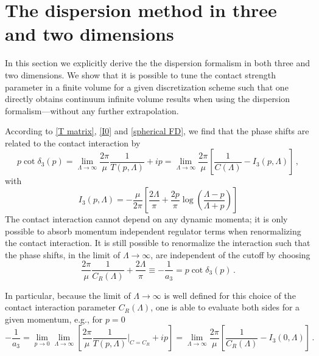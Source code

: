 \section{The dispersion method in three and two dimensions}\label{sec:3D dispersion}
In this section we explicitly derive the the dispersion formalism in both three and two dimensions.
We show that it is possible to tune the contact strength parameter in a finite volume for a given discretization scheme such that one directly obtains continuum infinite volume results when using the dispersion formalism---without any further extrapolation.

According to \eqref{T matrix}, \eqref{I0} and \eqref{spherical FD}, we find that the phase shifts are related to the contact interaction by
\begin{equation}\label{eq:blah blah}
	p \cot \delta_3(p)
	= \lim\limits_{\Lambda \to \infty}\frac{2 \pi}{\mu}\frac{1}{T(p, \Lambda)} + i p
	= \lim\limits_{\Lambda \to \infty}
		\frac{2 \pi}{\mu} \left[
			\frac{1}{C(\Lambda)} - I_3(p, \Lambda)
		\right]
	\, ,
\end{equation}
with
\begin{equation}
	I_3(p, \Lambda)
	=
	-\frac{\mu}{2 \pi}
	\left[
	\frac{2 \Lambda}{\pi} + \frac{2  p}{\pi} \log \left( \frac{\Lambda - p}{\Lambda + p}\right)
	\right]
\end{equation}
The contact interaction cannot depend on any dynamic momenta; it is only possible to absorb momentum independent regulator terms when renormalizing the contact interaction.
It is still possible to renormalize the interaction such that the phase shifts, in the limit of $\Lambda \to \infty$, are independent of the cutoff by choosing
\begin{equation}\label{eq:three-d-counterterm}
	\frac{2 \pi}{\mu} \frac{1}{C_R(\Lambda)} + \frac{2 \Lambda}{\pi}
	\equiv
	- \frac{1}{a_3}
	=
	p \cot \delta_3(p)
	\, .
\end{equation}

In particular, because the limit of $\Lambda \to \infty$ is well defined for this choice of the contact interaction parameter $C_R(\Lambda)$, one is able to evaluate both sides for a given momentum, e.g., for $p=0$
\begin{equation}
	- \frac{1}{a_3}
	=
	\lim\limits_{p \to 0}\lim\limits_{\Lambda \to \infty}
		\left[
			\frac{2 \pi}{\mu}\frac{1}{T(p, \Lambda)} \bigg|_{C=C_R} + i p
	\right]
	=
	\lim\limits_{\Lambda \to \infty}
	\frac{2 \pi}{\mu}
		\left[
		\frac{1}{C_R(\Lambda)} - I_3(0, \Lambda)
		\right]
	\, .
\end{equation}

